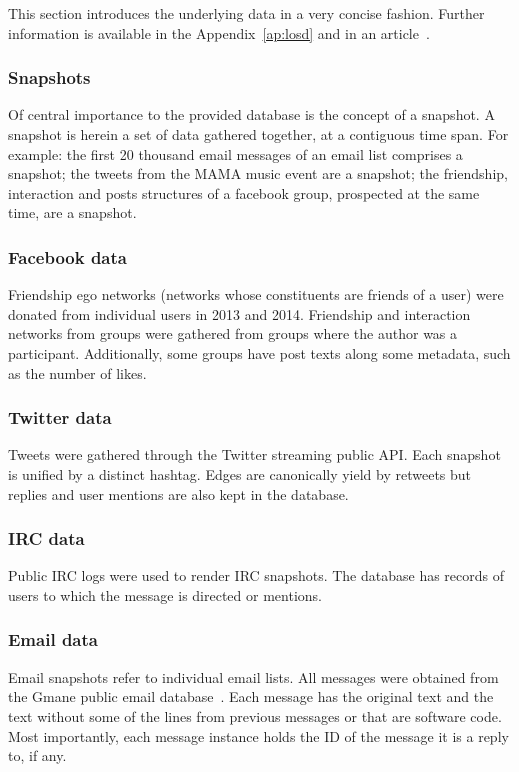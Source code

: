 This section introduces the underlying data in a very concise fashion.
Further information is available in the Appendix~\ref{ap:losd} and in an article~\cite{losd}.
 
\subsubsection{Snapshots}
Of central importance to the provided database is the concept of a snapshot.
A snapshot is herein a set of data gathered together,
at a contiguous time span.
For example: the first 20 thousand email messages of an email list
comprises a snapshot; the tweets from the MAMA music event are a
snapshot; the friendship, interaction and posts structures of a facebook
group, prospected at the same time, are a snapshot.

\subsubsection{Facebook data}
Friendship ego networks (networks whose constituents are friends of a user)
were donated from individual users in 2013 and 2014.
Friendship and interaction networks from groups were gathered from
groups where the author was a participant.
Additionally, some groups have post texts along some metadata, such as
the number of likes.

\subsubsection{Twitter data}
Tweets were gathered through the Twitter streaming public API.
Each snapshot is unified by a distinct hashtag.
Edges are canonically yield by retweets but replies and user mentions
are also kept in the database.

\subsubsection{IRC data}
Public IRC logs were used to render IRC snapshots.
The database has records of users to which the message is directed or
mentions.

\subsubsection{Email data}
Email snapshots refer to individual email lists.
All messages were obtained from the Gmane public email database~\cite{gmane}.
Each message has the original text and the text without some of the lines
from previous messages or that are software code.
Most importantly, each message instance holds the ID of the message it is
a reply to, if any.

